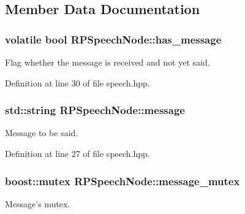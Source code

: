 \subsection{\-Member \-Data \-Documentation}
\hypertarget{class_r_p_speech_node_abde38eab3c8c480a7ab36d9b647da471}{
\subsubsection[{has\-\_\-message}]{\setlength{\rightskip}{0pt plus 5cm}volatile bool {\bf \-R\-P\-Speech\-Node\-::has\-\_\-message}}}\label{class_r_p_speech_node_abde38eab3c8c480a7ab36d9b647da471}
\-Flag whether the message is received and not yet said. 

\-Definition at line 30 of file speech.\-hpp.

\hypertarget{class_r_p_speech_node_a2b2d778809c22cc4e94d7169ee84fe8c}{
\subsubsection[{message}]{\setlength{\rightskip}{0pt plus 5cm}std\-::string {\bf \-R\-P\-Speech\-Node\-::message}}}\label{class_r_p_speech_node_a2b2d778809c22cc4e94d7169ee84fe8c}
\-Message to be said. 

\-Definition at line 27 of file speech.\-hpp.

\hypertarget{class_r_p_speech_node_a3238569cd6c25aa4768e78b390fbb8f8}{
\subsubsection[{message\-\_\-mutex}]{\setlength{\rightskip}{0pt plus 5cm}boost\-::mutex {\bf \-R\-P\-Speech\-Node\-::message\-\_\-mutex}}}\label{class_r_p_speech_node_a3238569cd6c25aa4768e78b390fbb8f8}
\-Message's mutex. 

